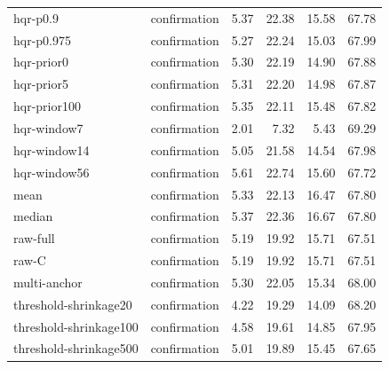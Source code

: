 \begin{longtable}{llrrrr}
hqr-p0.9 & confirmation & 5.37 & 22.38 & 15.58 & 67.78\\
hqr-p0.975 & confirmation & 5.27 & 22.24 & 15.03 & 67.99\\
hqr-prior0 & confirmation & 5.30 & 22.19 & 14.90 & 67.88\\
hqr-prior5 & confirmation & 5.31 & 22.20 & 14.98 & 67.87\\
hqr-prior100 & confirmation & 5.35 & 22.11 & 15.48 & 67.82\\
hqr-window7 & confirmation & 2.01 & 7.32 & 5.43 & 69.29\\
hqr-window14 & confirmation & 5.05 & 21.58 & 14.54 & 67.98\\
hqr-window56 & confirmation & 5.61 & 22.74 & 15.60 & 67.72\\
mean & confirmation & 5.33 & 22.13 & 16.47 & 67.80\\
median & confirmation & 5.37 & 22.36 & 16.67 & 67.80\\
raw-full & confirmation & 5.19 & 19.92 & 15.71 & 67.51\\
raw-C & confirmation & 5.19 & 19.92 & 15.71 & 67.51\\
multi-anchor & confirmation & 5.30 & 22.05 & 15.34 & 68.00\\
threshold-shrinkage20 & confirmation & 4.22 & 19.29 & 14.09 & 68.20\\
threshold-shrinkage100 & confirmation & 4.58 & 19.61 & 14.85 & 67.95\\
threshold-shrinkage500 & confirmation & 5.01 & 19.89 & 15.45 & 67.65\\
\end{longtable}\endgroup
